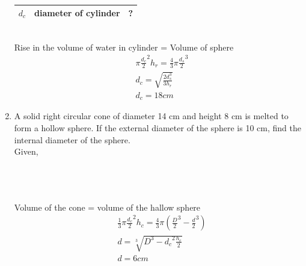 \documentclass[journal,12pt,twocolumn]{IEEEtran}
\renewcommand\thesection{\arabic{section}}
\begin{document}
\begin{enumerate}[label=\thesection.\arabic*.,ref=\thesection.\theenumi]
\begin{table}[ht]
{\begin{tabular}{ |c|c|c| }
 \hline
 $d_c$ & diameter of cylinder &? \\
 \hline
\end{tabular}}
 \caption{}
 \end{table}\\
 Rise in the volume of water in cylinder = Volume of sphere
 \begin{align}
 &\pi \displaystyle\frac{d_c}{2}^2h_r = \displaystyle\frac{4}{3}\pi  \displaystyle\frac{d_s}{2}^3\\
 &d_c = \sqrt{\displaystyle\frac{2d_s^3}{3h_r}}\\
 & d_c = 18cm
 \end{align}
\item A solid right circular cone of diameter 14 cm and height 8 cm is melted to form a hollow
sphere. If the external diameter of the sphere is
10 cm, find the internal diameter of the sphere.\\
\solution
Given, \\  \\ \\
\begin{table}[ht]
 \centering
 \caption{}
 \end{table}\\
Volume of the cone = volume of the hallow sphere
\begin{align}
&\displaystyle\frac{1}{3} \pi \displaystyle\frac{d_c}{2}^2h_c = \displaystyle\frac{4}{3} \pi \left( \displaystyle\frac{D}{2}^3 - \displaystyle\frac{d}{2}^3 \right) \\
& d = \sqrt[3]{{D}^3 - {d_c}^2\displaystyle\frac{h_c}{2} } \\
&d =6 cm
\end{align} 
\end{enumerate}
\end{document}
